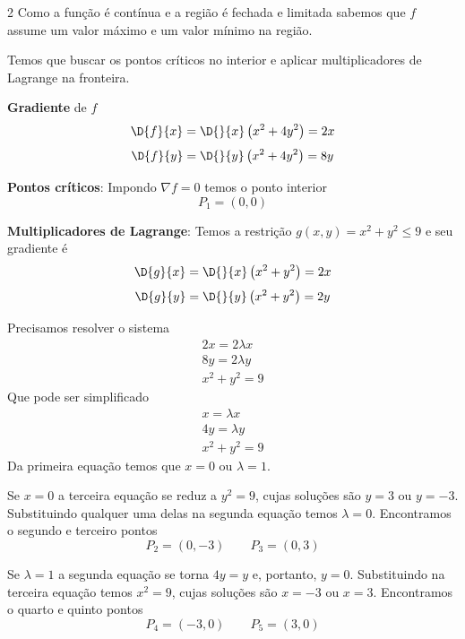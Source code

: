 \documentclass[a4paper,12pt,fleqn]{article}
\begin{document}
\begin{answer}
\setlength\columnsep{3em}
\setlength{\jot}{5pt}
\begin{multicols*}{2}
  \raggedcolumns
  Como a função é contínua e a região é fechada e limitada sabemos que
  $f$ assume um valor máximo e um valor mínimo na região.

  \vspace{\baselineskip}
  Temos que buscar os pontos críticos no interior e aplicar multiplicadores
  de Lagrange na fronteira.

  \vspace{\baselineskip}
  \textbf{Gradiente} de $f$
  \[
    \D{f}{x}
    = \D{}{x}\left(x^2 + 4y^2\right)
    = 2x
  \]
  \[
    \D{f}{y}
    = \D{}{y}\left(x^2 + 4y^2\right)
    = 8y
  \]

  \vspace{\baselineskip}
  \textbf{Pontos críticos}:
  Impondo \(\nabla f = 0\) temos o ponto interior
  \[
    P_1 = (0, 0)
  \]

  \vspace{\baselineskip}
  \textbf{Multiplicadores de Lagrange}:
  Temos a restrição \(g(x, y) = x^2 + y^2 \leq 9\) e seu gradiente é
  \[
    \D{g}{x}
    = \D{}{x}\left(x^2 + y^2\right)
    = 2x
  \]
  \[
    \D{g}{y}
    = \D{}{y}\left(x^2 + y^2\right)
    = 2y
  \]

  Precisamos resolver o sistema
  \begin{gather*}
    2x = 2\lambda x \\
    8y = 2\lambda y \\
    x^2 + y^2 = 9
  \end{gather*}
  Que pode ser simplificado
  \begin{gather*}
    x = \lambda x \\
    4y = \lambda y \\
    x^2 + y^2 = 9
  \end{gather*}
  Da primeira equação temos que $x=0$ ou $\lambda=1$.

  Se $x=0$ a terceira equação se reduz a $y^2=9$, cujas soluções são
  $y=3$ ou $y=-3$. Substituindo qualquer uma delas na segunda equação
  temos $\lambda = 0$. Encontramos o segundo e terceiro pontos
  \[
    P_2 = (0, -3)
    \qquad
    P_3 = (0, 3)
  \]

  Se $\lambda=1$ a segunda equação se torna $4y=y$ e, portanto, $y=0$.
  Substituindo na terceira equação temos $x^2=9$, cujas soluções são
  $x=-3$ ou $x=3$.  Encontramos o quarto e quinto pontos
  \[
    P_4 = (-3, 0)
  \qquad
    P_5 = (3, 0)
  \]


\end{multicols*}
\end{answer}
\end{document}
